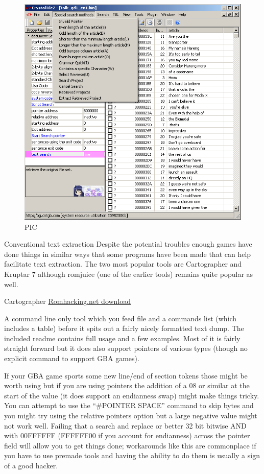 \documentclass[
]{book}
\begin{document}
\begin{figure}
\centering
\includegraphics{images/132_home_fast6191_romhackingguide_unrenamed_fil___l_borders_romhackingguiderCT2textextraction.png}
\caption{PIC}
\end{figure}

Conventional text extraction Despite the potential troubles enough games have done things in similar ways that some programs have been made that can help facilitate text extraction. The two most popular tools are Cartographer and Kruptar 7 although romjuice (one of the earlier tools) remains quite popular as well.

Cartographer \href{http://www.romhacking.net/utilities/647/}{Romhacking.net download}

A command line only tool which you feed file and a commands list (which includes a table) before it spits out a fairly nicely formatted text dump. The included readme contains full usage and a few examples. Most of it is fairly straight forward but it does also support pointers of various types (though no explicit command to support GBA games).

If your GBA game sports some new line/end of section tokens those might be worth using but if you are using pointers the addition of a 08 or similar at the start of the value (it does support an endianness swap) might make things tricky. You can attempt to use the ``\#POINTER SPACE'' command to skip bytes and you might try using the relative pointers option but a large negative value might not work well. Failing that a search and replace or better 32 bit bitwise AND with 00FFFFFF (FFFFFF00 if you account for endianness) across the pointer field will allow you to get things done; workarounds like this are commonplace if you have to use premade tools and having the ability to do them is usually a sign of a good hacker.
\end{document}
